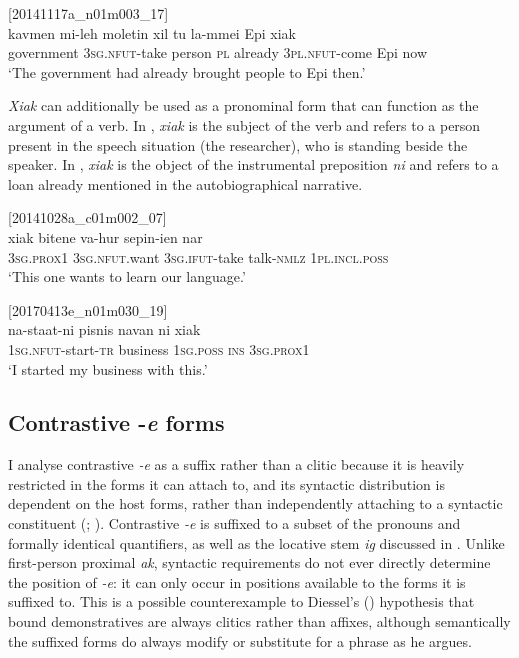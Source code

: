 \documentclass[output=paper,colorlinks,citecolor=brown]{langscibook}
\begin{document}
\ea
{\label{ex:ridge:25}[20141117a\_n01m003\_17]}\\
\gll kavmen    mi-leh      moletin   xil tu     la-mmei     Epi   xiak\\
     government   \textsc{3sg.nfut}{}-take  person   \textsc{pl} already \textsc{3pl.nfut}{}-come   Epi   now\\
\glt ‘The government had already brought people to Epi then.’
\z

\textit{Xiak} can additionally be used as a pronominal form that can function as the argument of a verb. In , \textit{xiak} is the subject of the verb and refers to a person present in the speech situation (the researcher), who is standing beside the speaker. In , \textit{xiak} is the object of the instrumental preposition \textit{ni} and refers to a loan already mentioned in the autobiographical narrative.

\ea
{\label{ex:ridge:26}[20141028a\_c01m002\_07]}\\
\gll xiak    bitene      va-hur      sepin-ien  nar\\
     \textsc{3sg.prox1}   \textsc{3sg.nfut.}want   \textsc{3sg.ifut-}take   talk-\textsc{nmlz}   \textsc{1pl.incl.poss}\\
\glt ‘This one wants to learn our language.’
\z

\ea
{\label{ex:ridge:27}[20170413e\_n01m030\_19]}\\
\gll na-staat-ni    pisnis  navan    ni  xiak\\
     \textsc{1sg.nfut-}start-\textsc{tr} business  \textsc{1sg.poss}  \textsc{ins}  \textsc{3sg.prox1}\\
\glt ‘I started my business with this.’
\z


\subsection{Contrastive -\textit{e} forms}
\label{sec:ridge:3.2}

I analyse contrastive \textit{-e} as a suffix rather than a clitic because it is heavily restricted in the forms it can attach to, and its syntactic distribution is dependent on the host forms, rather than independently attaching to a syntactic constituent (\citealt{ZwickyPullum1983}; \citealt{SpencerLuís2012}). Contrastive \textit{-e} is suffixed to a subset of the pronouns and formally identical quantifiers, as well as the locative stem \textit{ig} discussed in . Unlike first-person proximal \textit{ak}, syntactic requirements do not ever directly determine the position of \textit{-e}: it can only occur in positions available to the forms it is suffixed to. This is a possible counterexample to Diessel’s (\citeyear[25]{Diessel1999Book}) hypothesis that bound demonstratives are always clitics rather than affixes, although semantically the suffixed forms do always modify or substitute for a phrase as he argues.
\end{document}
